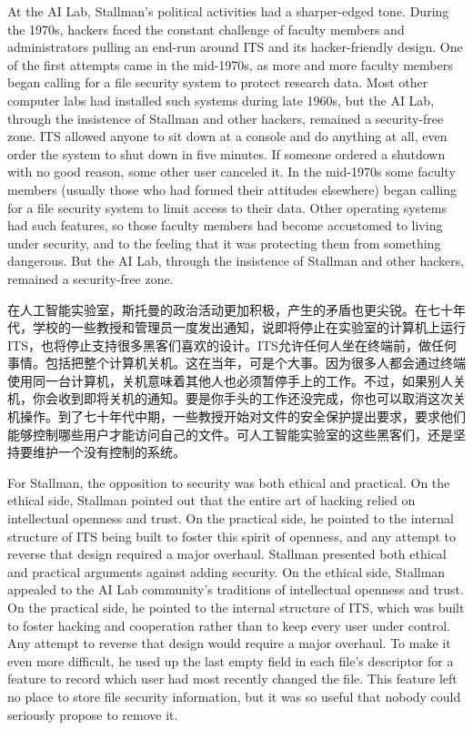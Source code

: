 \ifdefined\eng
At the AI Lab, Stallman's political activities had a sharper-edged tone. During the 1970s, hackers faced the constant challenge of faculty members and administrators pulling an end-run around ITS and its hacker-friendly design. \ifdefined\vone One of the first attempts came in the mid-1970s, as more and more faculty members began calling for a file security system to protect research data. Most other computer labs had installed such systems during late 1960s, but the AI Lab, through the insistence of Stallman and other hackers, remained a security-free zone. \fi\ifdefined\vtwo ITS allowed anyone to sit down at a console and do anything at all, even order the system to shut down in five minutes. If someone ordered a shutdown with no good reason, some other user canceled it. In the mid-1970s some faculty members (usually those who had formed their attitudes elsewhere) began calling for a file security system to limit access to their data.   Other operating systems had such features, so those faculty members had become accustomed to living under security, and to the feeling that it was protecting them from something dangerous. But the AI Lab, through the insistence of Stallman and other hackers, remained a security-free zone.\fi
\fi

\ifdefined\chs
在人工智能实验室，斯托曼的政治活动更加积极，产生的矛盾也更尖锐。在七十年代，学校的一些教授和管理员一度发出通知，说即将停止在实验室的计算机上运行ITS，也将停止支持很多黑客们喜欢的设计。\ifdefined\vtwo ITS允许任何人坐在终端前，做任何事情。包括把整个计算机关机。这在当年，可是个大事。因为很多人都会通过终端使用同一台计算机，关机意味着其他人也必须暂停手上的工作。不过，如果别人关机，你会收到即将关机的通知。要是你手头的工作还没完成，你也可以取消这次关机操作。\fi 到了七十年代中期，一些教授开始对文件的安全保护提出要求，要求他们能够控制哪些用户才能访问自己的文件。可人工智能实验室的这些黑客们，还是坚持要维护一个没有控制的系统。
\fi

\ifdefined\eng
\ifdefined\vone
For Stallman, the opposition to security was both ethical and practical. On the ethical side, Stallman pointed out that the entire art of hacking relied on intellectual openness and trust. On the practical side, he pointed to the internal structure of ITS being built to foster this spirit of openness, and any attempt to reverse that design required a major overhaul.
\fi
\ifdefined\vtwo
Stallman presented both ethical and practical arguments against adding security. On the ethical side, Stallman appealed to the AI Lab community's traditions of intellectual openness and trust. On the practical side, he pointed to the internal structure of ITS, which was built to foster hacking and cooperation rather than to keep every user under control.  Any attempt to reverse that design would require a major overhaul. To make it even more difficult, he used up the last empty field in each file's descriptor for a feature to record which user had most recently changed the file. This feature left no place to store file security information, but it was so useful that nobody could seriously propose to remove it.
\fi
\fi

